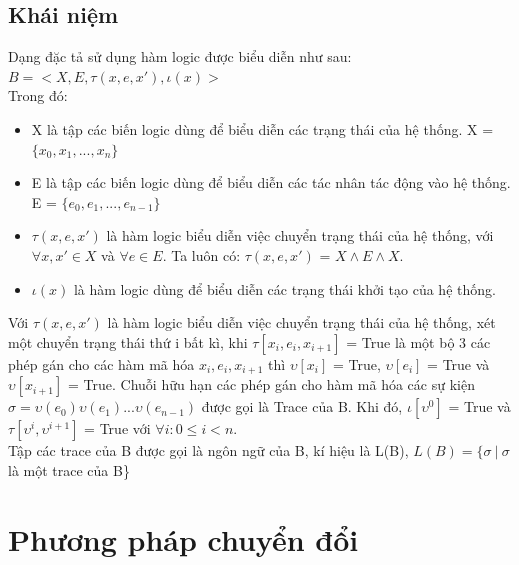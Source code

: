 \documentclass{article}
\begin{document}
\begin{flushleft}
			\subsection{Khái niệm}
			Dạng đặc tả sử dụng hàm logic được biểu diễn như sau: \\
				$B = <X, E, \tau(x, e, x'), \iota(x)>$\\
				Trong đó:\\
				\begin{itemize}
					\item X là tập các biến logic dùng để biểu diễn các trạng thái của hệ thống. X = $\{x_0, x_1, ..., x_n\}$
					\item E là tập các biến logic dùng để biểu diễn các tác nhân tác động vào hệ thống. E = $\{e_0, e_1, ..., e_{n-1}\}$
					\item $\tau(x, e, x')$ là hàm logic biểu diễn việc chuyển trạng thái của hệ thống, với $\forall x, x' \in X$ và $\forall e \in E$. Ta luôn có:
					$\tau(x, e, x')$ = $X \land E \land X$.
					\item $\iota(x)$ là hàm logic dùng để biểu diễn các trạng thái khởi tạo của hệ thống.
				\end{itemize}
				Với $\tau(x, e, x')$ là hàm logic biểu diễn việc chuyển trạng thái của hệ thống, xét một chuyển trạng thái thứ i bất kì, khi $\tau[x_i, e_i, x_{i+1}]$ = True là một bộ 3 các phép gán cho các hàm mã hóa $x_i, e_i, x_{i+1}$ thì $\upsilon[x_i]$ = True, $\upsilon[e_i]$ = True và $\upsilon[x_{i+1}]$ = True. Chuỗi hữu hạn các phép gán cho hàm mã hóa các sự kiện $\sigma = \upsilon(e_0)\upsilon(e_1)...\upsilon(e_{n-1})$ được gọi là Trace của B. Khi đó, $\iota[\upsilon^0]$ = True và $\tau[\upsilon^i, \upsilon^{i+1}]$ = True với $\forall i: 0 \leq i < n$.\\
				Tập các trace của B được gọi là ngôn ngữ của B, kí hiệu là L(B), $L(B) = \{\sigma\ |\ \sigma$ là một trace của B\}\\
		\section{Phương pháp chuyển đổi}

\end{flushleft}
\end{document}
